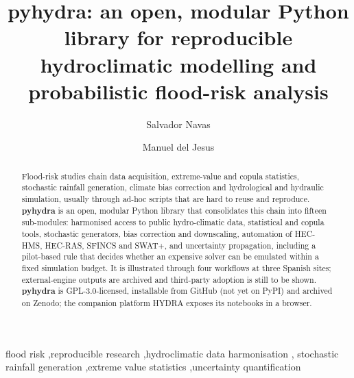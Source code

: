 \documentclass[preprint,12pt,a4paper]{elsarticle}
\newcommand{\pyhydra}{\textbf{pyhydra}}
\begin{document}
\begin{frontmatter}

\title{\texorpdfstring{\textbf{pyhydra}}{pyhydra}: an open, modular Python library for reproducible hydroclimatic modelling and probabilistic flood-risk analysis}

\author[1]{Salvador Navas}


\author[2]{Manuel del Jesus}


\begin{abstract}
Flood-risk studies chain data acquisition, extreme-value and copula
statistics, stochastic rainfall generation, climate bias correction and
hydrological and hydraulic simulation, usually through ad-hoc scripts that
are hard to reuse and reproduce. \pyhydra{} is an open, modular Python
library that consolidates this chain into fifteen sub-modules: harmonised
access to public hydro-climatic data, statistical and copula tools,
stochastic generators, bias correction and downscaling, automation of
HEC-HMS, HEC-RAS, SFINCS and SWAT+, and uncertainty propagation, including
a pilot-based rule that decides whether an expensive solver can be emulated
within a fixed simulation budget. It is illustrated through four workflows
at three Spanish sites; external-engine outputs are archived and third-party
adoption is still to be shown. \pyhydra{} is
GPL-3.0-licensed, installable from GitHub (not yet on PyPI) and archived on
Zenodo; the companion platform HYDRA exposes its notebooks in a browser.
\end{abstract}

\begin{keyword}
flood risk \sep reproducible research \sep hydroclimatic data harmonisation \sep
stochastic rainfall generation \sep extreme value statistics \sep uncertainty quantification
\end{keyword}

\end{frontmatter}
\end{document}
